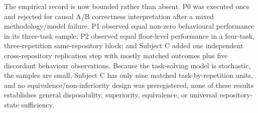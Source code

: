 The empirical record is now bounded rather than absent. P0 was executed once and rejected for causal A/B correctness interpretation after a mixed methodology/model failure. P1 observed equal non-zero behavioural performance in its three-task sample; P2 observed equal floor-level performance in a four-task, three-repetition same-repository block; and Subject C added one independent cross-repository replication step with mostly matched outcomes plus five discordant behaviour observations. Because the task-solving model is stochastic, the samples are small, Subject C has only nine matched task-by-repetition units, and no equivalence/non-inferiority design was preregistered, none of these results establishes general disposability, superiority, equivalence, or universal repository-state sufficiency.
